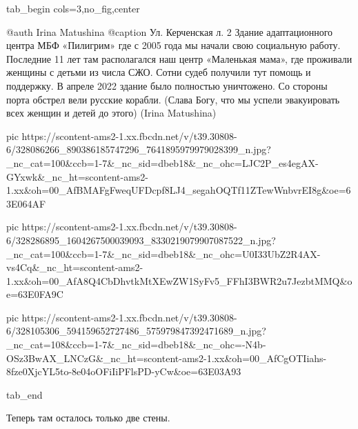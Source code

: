  
 
 
 
 


\ifcmt
  tab_begin cols=3,no_fig,center

     @auth Irina Matushina
     @caption Ул. Керченская л. 2 Здание адаптационного центра МБФ «Пилигрим» где с 2005 года мы начали свою социальную работу. Последние 11 лет там располагался наш центр «Маленькая мама», где проживали женщины с детьми из числа СЖО. Сотни судеб получили тут помощь и поддержку. В апреле 2022 здание было полностью уничтожено. Со стороны порта обстрел вели русские корабли. (Слава Богу, что мы успели эвакуировать всех женщин и детей до этого) (Irina Matushina)

     pic https://scontent-ams2-1.xx.fbcdn.net/v/t39.30808-6/328086266_890386185747296_7641895979979028399_n.jpg?_nc_cat=100&ccb=1-7&_nc_sid=dbeb18&_nc_ohc=LJC2P_es4egAX-GYxwk&_nc_ht=scontent-ams2-1.xx&oh=00_AfBMAFgFweqUFDcpf8LJ4_segahOQTf11ZTewWnbvrEI8g&oe=63E064AF

     pic https://scontent-ams2-1.xx.fbcdn.net/v/t39.30808-6/328286895_1604267500039093_8330219079907087522_n.jpg?_nc_cat=100&ccb=1-7&_nc_sid=dbeb18&_nc_ohc=U0I33UbZ2R4AX-vs4Cq&_nc_ht=scontent-ams2-1.xx&oh=00_AfA8Q4CbDhvtkMtXEwZW1SyFv5_FFhI3BWR2u7JezbtMMQ&oe=63E0FA9C

     pic https://scontent-ams2-1.xx.fbcdn.net/v/t39.30808-6/328105306_594159652727486_575979847392471689_n.jpg?_nc_cat=108&ccb=1-7&_nc_sid=dbeb18&_nc_ohc=-N4b-OSz3BwAX_LNCzG&_nc_ht=scontent-ams2-1.xx&oh=00_AfCgOTIiahs-8fze0XjcYL5to-8e04oOFiIiPFlsPD-yCw&oe=63E03A93

  tab_end
\fi


Теперь там осталось только две стены.
